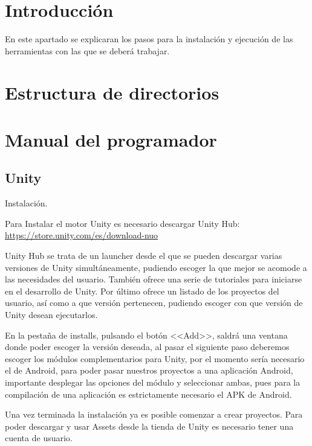 
\section{Introducción}
En este apartado se explicaran los pasos para la instalación y ejecución de las herramientas con las que se deberá trabajar.

\section{Estructura de directorios}

\section{Manual del programador}
\subsection{Unity}
Instalación.

Para Instalar el motor Unity es necesario descargar Unity Hub: \url{https://store.unity.com/es/download-nuo}

Unity Hub se trata de un launcher desde el que se pueden descargar varias versiones de Unity simultáneamente, pudiendo escoger la que mejor se acomode a las necesidades del usuario. También ofrece una serie de tutoriales para iniciarse en el desarrollo de Unity. Por último ofrece un listado de los proyectos del usuario, así como a que versión pertenecen, pudiendo escoger con que versión de Unity desean ejecutarlos.

En la pestaña de installs, pulsando el botón <<Add>>, saldrá una ventana donde poder escoger la versión deseada, al pasar el siguiente paso deberemos escoger los módulos complementarios para Unity, por el momento sería necesario el de Android, para poder pasar nuestros proyectos a una aplicación Android, importante desplegar las opciones del módulo y seleccionar ambas, pues para la compilación de una aplicación es estrictamente necesario el APK de Android.

Una vez terminada la instalación ya es posible comenzar a crear proyectos. 
Para poder descargar y usar Assets desde la tienda de Unity es necesario tener una cuenta de usuario.

